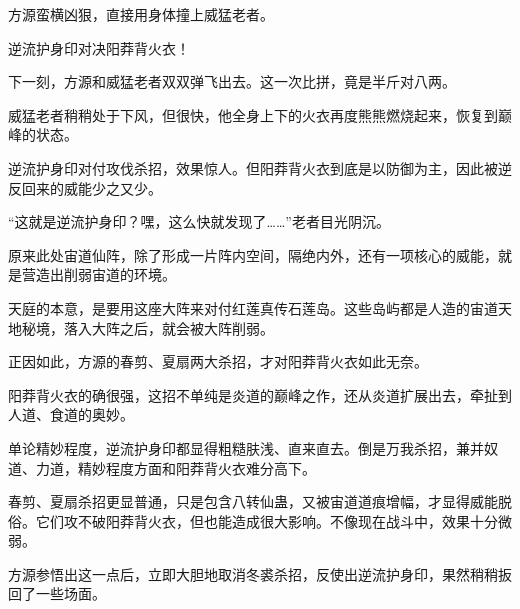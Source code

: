 \begin{this_body}
方源蛮横凶狠，直接用身体撞上威猛老者。

逆流护身印对决阳莽背火衣！

下一刻，方源和威猛老者双双弹飞出去。这一次比拼，竟是半斤对八两。

威猛老者稍稍处于下风，但很快，他全身上下的火衣再度熊熊燃烧起来，恢复到巅峰的状态。

逆流护身印对付攻伐杀招，效果惊人。但阳莽背火衣到底是以防御为主，因此被逆反回来的威能少之又少。

“这就是逆流护身印？嘿，这么快就发现了……”老者目光阴沉。

原来此处宙道仙阵，除了形成一片阵内空间，隔绝内外，还有一项核心的威能，就是营造出削弱宙道的环境。

天庭的本意，是要用这座大阵来对付红莲真传石莲岛。这些岛屿都是人造的宙道天地秘境，落入大阵之后，就会被大阵削弱。

正因如此，方源的春剪、夏扇两大杀招，才对阳莽背火衣如此无奈。

阳莽背火衣的确很强，这招不单纯是炎道的巅峰之作，还从炎道扩展出去，牵扯到人道、食道的奥妙。

单论精妙程度，逆流护身印都显得粗糙肤浅、直来直去。倒是万我杀招，兼并奴道、力道，精妙程度方面和阳莽背火衣难分高下。

春剪、夏扇杀招更显普通，只是包含八转仙蛊，又被宙道道痕增幅，才显得威能脱俗。它们攻不破阳莽背火衣，但也能造成很大影响。不像现在战斗中，效果十分微弱。

方源参悟出这一点后，立即大胆地取消冬裘杀招，反使出逆流护身印，果然稍稍扳回了一些场面。

\end{this_body}


